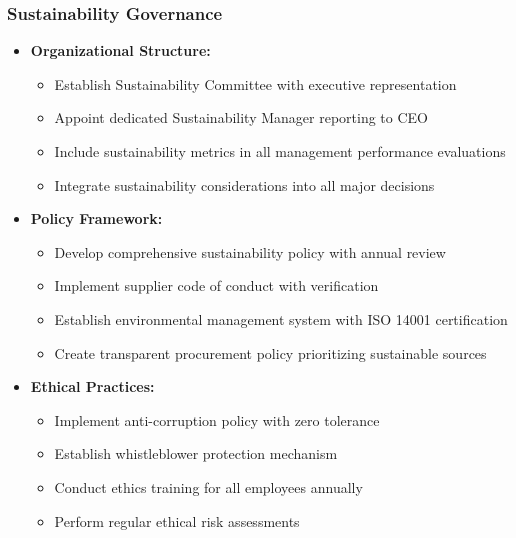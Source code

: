 \subsubsection{Sustainability Governance}
\begin{itemize}
    \item \textbf{Organizational Structure:}
    \begin{itemize}
        \item Establish Sustainability Committee with executive representation
        \item Appoint dedicated Sustainability Manager reporting to CEO
        \item Include sustainability metrics in all management performance evaluations
        \item Integrate sustainability considerations into all major decisions
    \end{itemize}
    
    \item \textbf{Policy Framework:}
    \begin{itemize}
        \item Develop comprehensive sustainability policy with annual review
        \item Implement supplier code of conduct with verification
        \item Establish environmental management system with ISO 14001 certification
        \item Create transparent procurement policy prioritizing sustainable sources
    \end{itemize}
    
    \item \textbf{Ethical Practices:}
    \begin{itemize}
        \item Implement anti-corruption policy with zero tolerance
        \item Establish whistleblower protection mechanism
        \item Conduct ethics training for all employees annually
        \item Perform regular ethical risk assessments
    \end{itemize}
\end{itemize}

